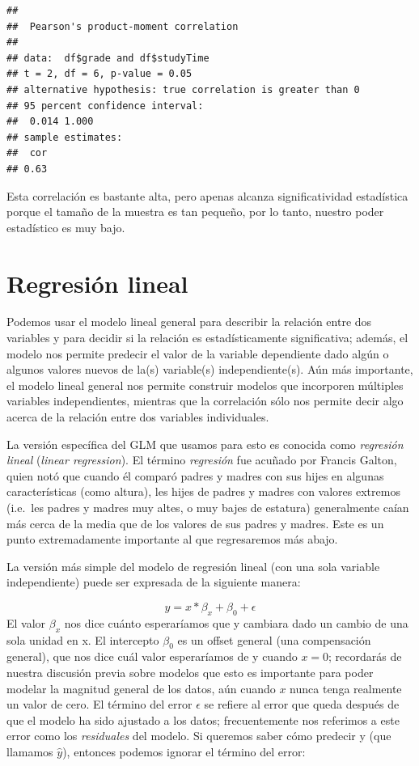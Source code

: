 \documentclass[
  12pt,
]{book}
\theoremstyle{definition}
\theoremstyle{definition}
\theoremstyle{definition}
\theoremstyle{remark}
\begin{document}
\begin{verbatim}
## 
## 	Pearson's product-moment correlation
## 
## data:  df$grade and df$studyTime
## t = 2, df = 6, p-value = 0.05
## alternative hypothesis: true correlation is greater than 0
## 95 percent confidence interval:
##  0.014 1.000
## sample estimates:
##  cor 
## 0.63
\end{verbatim}

Esta correlación es bastante alta, pero apenas alcanza significatividad estadística porque el tamaño de la muestra es tan pequeño, por lo tanto, nuestro poder estadístico es muy bajo.

\hypertarget{linear-regression}{%
\section{Regresión lineal}\label{linear-regression}}

Podemos usar el modelo lineal general para describir la relación entre dos variables y para decidir si la relación es estadísticamente significativa; además, el modelo nos permite predecir el valor de la variable dependiente dado algún o algunos valores nuevos de la(s) variable(s) independiente(s). Aún más importante, el modelo lineal general nos permite construir modelos que incorporen múltiples variables independientes, mientras que la correlación sólo nos permite decir algo acerca de la relación entre dos variables individuales.

La versión específica del GLM que usamos para esto es conocida como \emph{regresión lineal} (\emph{linear regression}). El término \emph{regresión} fue acuñado por Francis Galton, quien notó que cuando él comparó padres y madres con sus hijes en algunas características (como altura), les hijes de padres y madres con valores extremos (i.e.~les padres y madres muy altes, o muy bajes de estatura) generalmente caían más cerca de la media que de los valores de sus padres y madres. Este es un punto extremadamente importante al que regresaremos más abajo.

La versión más simple del modelo de regresión lineal (con una sola variable independiente) puede ser expresada de la siguiente manera:

\[
y = x * \beta_x + \beta_0 + \epsilon
\]
El valor \(\beta_x\) nos dice cuánto esperaríamos que y cambiara dado un cambio de una sola unidad en x. El intercepto \(\beta_0\) es un offset general (una compensación general), que nos dice cuál valor esperaríamos de y cuando \(x=0\); recordarás de nuestra discusión previa sobre modelos que esto es importante para poder modelar la magnitud general de los datos, aún cuando \(x\) nunca tenga realmente un valor de cero. El término del error \(\epsilon\) se refiere al error que queda después de que el modelo ha sido ajustado a los datos; frecuentemente nos referimos a este error como los \emph{residuales} del modelo. Si queremos saber cómo predecir y (que llamamos \(\hat{y}\)), entonces podemos ignorar el término del error:
\end{document}
